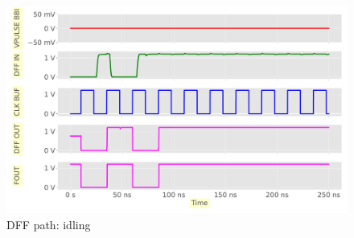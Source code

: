 
\begin{figure}[h]
	\centering
	\includegraphics[width=\columnwidth]{./figures/anim0000-cropped.pdf}
	\caption{DFF path: idling}
	\label{dffidle}
\end{figure}
